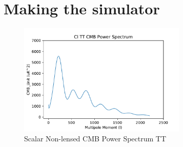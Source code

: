 \documentclass[twoside, fontsize=12pt,
     bibliography=totoc, %
     listof=totoc, %
     index=totoc, %
     onehalfspacing %
]{_MScDiss2017_cls}
\begin{document}
\section{Making the simulator}




\label{sec:template}


\begin{figure}[hbtp]
  \begin{center}
  \includegraphics[width=80mm]{Cl-TT-vs-l.pdf}
  \caption{Scalar Non-lensed CMB Power Spectrum TT} 
  \label{fig:test}
  \end{center}
\end{figure}

\begin{singlespace}%
    
\end{singlespace}
\end{document}
